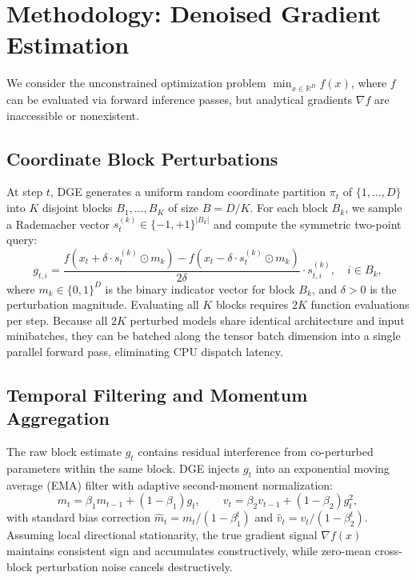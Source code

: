 \documentclass[11pt,a4paper]{article}
\begin{document}
\section{Methodology: Denoised Gradient Estimation}
\label{sec:method}

We consider the unconstrained optimization problem $\min_{x \in \mathbb{R}^D} f(x)$, where $f$ can be evaluated via forward inference passes, but analytical gradients $\nabla f$ are inaccessible or nonexistent.

\subsection{Coordinate Block Perturbations}
\label{sec:blocks}

At step $t$, DGE generates a uniform random coordinate partition $\pi_t$ of $\{1, \dots, D\}$ into $K$ disjoint blocks $B_1, \dots, B_K$ of size $B = D/K$. For each block $B_k$, we sample a Rademacher vector $s_t^{(k)} \in \{-1, +1\}^{|B_k|}$ and compute the symmetric two-point query:
\begin{equation}
    g_{t,i} = \frac{f(x_t + \delta \cdot s_t^{(k)} \odot m_k) - f(x_t - \delta \cdot s_t^{(k)} \odot m_k)}{2\delta} \cdot s_{t,i}^{(k)}, \quad i \in B_k,
    \label{eq:block_estimator}
\end{equation}
where $m_k \in \{0, 1\}^D$ is the binary indicator vector for block $B_k$, and $\delta > 0$ is the perturbation magnitude. Evaluating all $K$ blocks requires $2K$ function evaluations per step. Because all $2K$ perturbed models share identical architecture and input minibatches, they can be batched along the tensor batch dimension into a single parallel forward pass, eliminating CPU dispatch latency.

\subsection{Temporal Filtering and Momentum Aggregation}
\label{sec:ema}

The raw block estimate $g_t$ contains residual interference from co-perturbed parameters within the same block. DGE injects $g_t$ into an exponential moving average (EMA) filter with adaptive second-moment normalization:
\begin{equation}
    m_t = \beta_1 m_{t-1} + (1 - \beta_1) g_t, \qquad v_t = \beta_2 v_{t-1} + (1 - \beta_2) g_t^2,
    \label{eq:ema}
\end{equation}
with standard bias correction $\hat{m}_t = m_t / (1 - \beta_1^t)$ and $\hat{v}_t = v_t / (1 - \beta_2^t)$. Assuming local directional stationarity, the true gradient signal $\nabla f(x)$ maintains consistent sign and accumulates constructively, while zero-mean cross-block perturbation noise cancels destructively.
\end{document}
